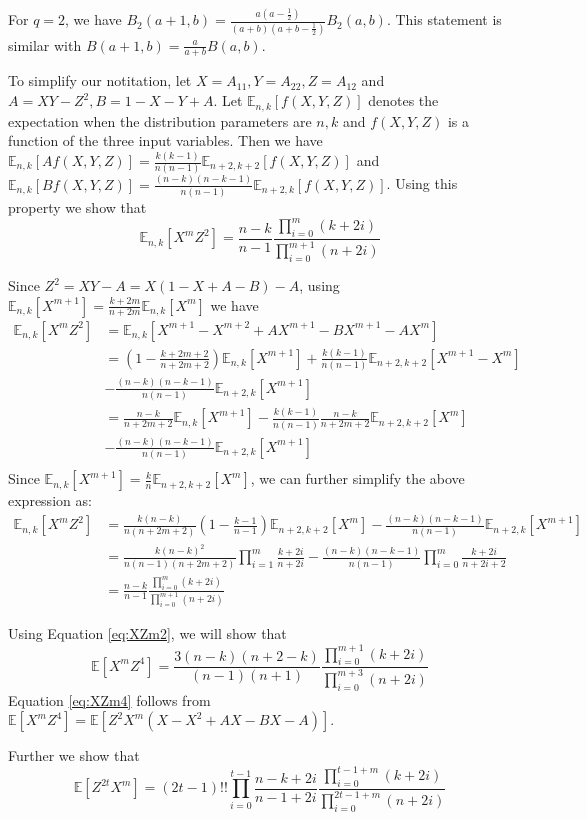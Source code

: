 \documentclass{article}
\def\E{\mathbb{E}}
\begin{document}
For $q=2$, we have $B_2(a+1,b)=\frac{a(a-\frac{1}{2})}{(a+b)(a+b-\frac{1}{2})} B_2(a,b)$. This statement is similar with
$B(a+1,b) = \frac{a}{a+b}B(a,b)$.

To simplify our notitation, let $X = A_{11}, Y = A_{22}, Z = A_{12}$ and $A = XY - Z^2, B = 1 - X - Y + A$. Let $\E_{n,k}[f(X,Y,Z)]$ denotes the expectation when the distribution parameters are $n, k$ and $f(X,Y,Z)$ is a function of the three input variables. Then we have $\E_{n,k}[Af(X,Y,Z)] = \frac{k(k-1)}{n(n-1)}\E_{n+2,k+2}[f(X,Y,Z)]$ and $\E_{n,k}[Bf(X,Y,Z)] = \frac{(n-k)(n-k-1)}{n(n-1)}\E_{n+2, k}[f(X,Y,Z)]$. Using this property we show that
\begin{equation}\label{eq:XZm2}
\E_{n,k}[X^m Z^2] = \frac{n-k}{n-1}\frac{\prod_{i=0}^m (k+2i)}{\prod_{i=0}^{m+1} (n+2i)}
\end{equation}

Since $Z^2 = XY - A = X(1-X+A-B)-A$, using $\E_{n,k}[X^{m+1}] = \frac{k+2m}{n+2m}\E_{n,k}[X^m]$ we have
\begin{align*}
\E_{n,k}[X^m Z^2] & = \E_{n,k}[X^{m+1}-X^{m+2}+AX^{m+1}-BX^{m+1}-AX^m] \\
& = (1-\frac{k+2m+2}{n+2m+2})\E_{n,k}[X^{m+1}] + \frac{k(k-1)}{n(n-1)}\E_{n+2,k+2}[X^{m+1} - X^m]\\
& - \frac{(n-k)(n-k-1)}{n(n-1)} \E_{n+2,k}[X^{m+1}] \\
& = \frac{n-k}{n+2m+2}\E_{n,k}[X^{m+1}] - \frac{k(k-1)}{n(n-1)}\frac{n-k}{n+2m+2}\E_{n+2,k+2}[X^m] \\
& - \frac{(n-k)(n-k-1)}{n(n-1)} \E_{n+2,k}[X^{m+1}] \\
\end{align*}
Since $\E_{n,k}[X^{m+1}] = \frac{k}{n}\E_{n+2,k+2}[X^m]$, we can further simplify the above expression as:
\begin{align*}
\E_{n,k}[X^m Z^2] &= \frac{k(n-k)}{n(n+2m+2)}(1-\frac{k-1}{n-1})\E_{n+2,k+2}[X^m]- \frac{(n-k)(n-k-1)}{n(n-1)} \E_{n+2,k}[X^{m+1}]\\
& = \frac{k(n-k)^2}{n(n-1)(n+2m+2)}\prod_{i=1}^m \frac{k+2i}{n+2i} - \frac{(n-k)(n-k-1)}{n(n-1)}\prod_{i=0}^m \frac{k+2i}{n+2i+2} \\
& = \frac{n-k}{n-1}\frac{\prod_{i=0}^m (k+2i)}{\prod_{i=0}^{m+1} (n+2i)}
\end{align*}

Using Equation \eqref{eq:XZm2}, we will show that
\begin{equation}\label{eq:XZm4}
\E[X^m Z^4] = \frac{3(n-k)(n+2-k)}{(n-1)(n+1)} \frac{\prod_{i=0}^{m+1} (k+2i)}{\prod_{i=0}^{m+3} (n+2i)}
\end{equation}
Equation \eqref{eq:XZm4} follows from $\E[X^m Z^4 ] = \E[Z^2 X^m(X-X^2 +AX-BX-A)]$.

Further we show that
\begin{equation}
\E[Z^{2t} X^m] = (2t-1)!! \prod_{i=0}^{t-1}\frac{n-k+2i}{n-1+2i} \frac{\prod_{i=0}^{t-1+m} (k+2i)}{\prod_{i=0}^{2t-1+m}(n+2i)}
\end{equation}


\end{document}
